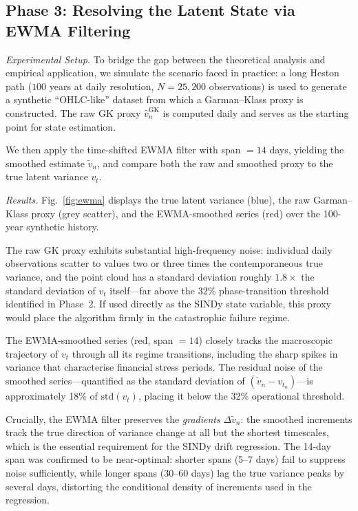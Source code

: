 \documentclass[reprint, amsmath, amssymb, aps, prl, superscriptaddress, nofootinbib]{revtex4-2}
\begin{document}
\subsection{Phase 3: Resolving the Latent State via EWMA Filtering}

\textit{Experimental Setup.}
To bridge the gap between the theoretical analysis and empirical application,
we simulate the scenario faced in practice: a long Heston path ($100$ years at
daily resolution, $N = 25{,}200$ observations) is used to generate a synthetic
``OHLC-like'' dataset from which a Garman--Klass proxy is constructed. The
raw GK proxy $\widehat{v}_n^{\mathrm{GK}}$ is computed daily and serves as
the starting point for state estimation.

We then apply the time-shifted EWMA filter with span $= 14$ days, yielding
the smoothed estimate $\widetilde{v}_n$, and compare both the raw and smoothed
proxy to the true latent variance $v_t$.

\textit{Results.}
Fig.~\ref{fig:ewma} displays the true latent variance (blue), the raw
Garman--Klass proxy (grey scatter), and the EWMA-smoothed series (red) over
the 100-year synthetic history.

The raw GK proxy exhibits substantial high-frequency noise: individual daily
observations scatter to values two or three times the contemporaneous true
variance, and the point cloud has a standard deviation roughly $1.8\times$ the
standard deviation of $v_t$ itself---far above the 32\% phase-transition threshold
identified in Phase~2. If used directly as the SINDy state variable, this proxy
would place the algorithm firmly in the catastrophic failure regime.

The EWMA-smoothed series (red, span $= 14$) closely tracks the macroscopic
trajectory of $v_t$ through all its regime transitions, including the sharp
spikes in variance that characterise financial stress periods. The residual
noise of the smoothed series---quantified as the standard deviation of
$(\widetilde{v}_n - v_{t_n})$---is approximately 18\% of $\mathrm{std}(v_t)$,
placing it below the 32\% operational threshold.

Crucially, the EWMA filter preserves the \emph{gradients} $\Delta\widetilde{v}_n$:
the smoothed increments track the true direction of variance change at all
but the shortest timescales, which is the essential requirement for the SINDy
drift regression. The 14-day span was confirmed to be near-optimal: shorter
spans (5--7 days) fail to suppress noise sufficiently, while longer spans
(30--60 days) lag the true variance peaks by several days, distorting the
conditional density of increments used in the regression.
\end{document}
